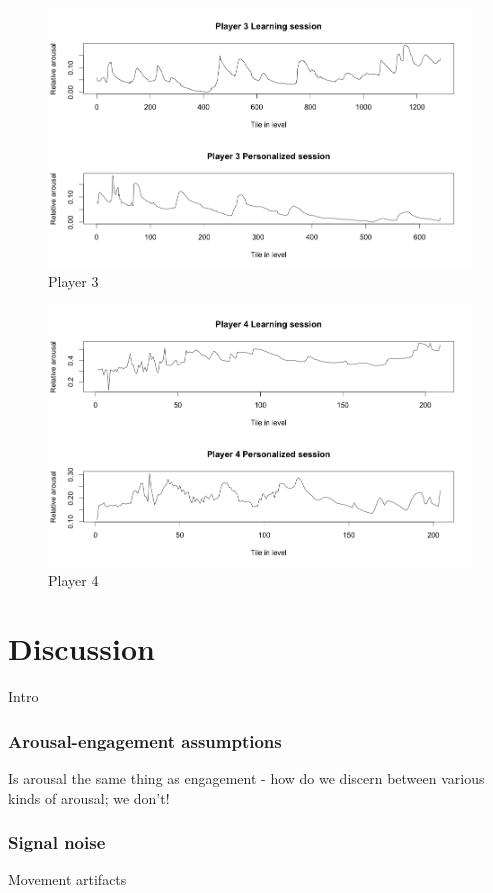 \documentclass{llncs}
\begin{document}
\begin{figure}
\centering
\includegraphics[scale=0.4]{p3.png}
\caption{Player 3}
\label{fig:screenshot1}
\end{figure}
\begin{figure}
\centering
\includegraphics[scale=0.4]{p4.png}
\caption{Player 4}
\label{fig:screenshot1}
\end{figure}

\section{Discussion}
Intro
\subsubsection{Arousal-engagement assumptions}
Is arousal the same thing as engagement - how do we discern between various kinds of arousal; we don't!
\subsubsection{Signal noise}
Movement artifacts
\end{document}
